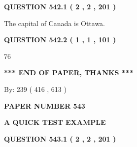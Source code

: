 \documentclass[12pt]{article}
\begin{document}
{\textbf{\Large{QUESTION
542.1 
 ( 2 , 2 , 201 )
}}}
  
  
 
 
\noindent{}
 
 
The capital of Canada is Ottawa.
 
 
 
 
  
\vspace{0.2in}
  
{\textbf{\Large{QUESTION
542.2 
 ( 1 , 1 , 101 )
}}}
  
  
 
 
\noindent{}

76
 
 
   
   
 \vspace{0.2in}
 
   
   
   
   
\vspace{1.0in} 
{\textbf{\large{ *** END OF PAPER, THANKS *** }}} 
   
   
\hspace{1.0in} By: 
 239 ( 416 ,  613 )
   
   
   
   
\newpage 
\setcounter{page}{ 
   543001 } 
   
   
   
   
 {\textbf{ \Large{ PAPER NUMBER  543  }}}
   
   
\vspace{0.2in}
   
   
   
   
   
   
 \vspace{0.2in}
{\LARGE {\textbf{ A QUICK TEST EXAMPLE}}}
   
   
  
\vspace{0.2in}
  
{\textbf{\Large{QUESTION
543.1 
 ( 2 , 2 , 201 )
}}}
  
  
 
 
\noindent{}
 
\end{document}
